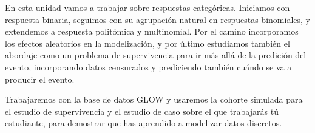 \documentclass[
  letterpaper,
  DIV=11,
  numbers=noendperiod]{scrartcl}
\begin{document}
\begin{tcolorbox}[enhanced jigsaw, breakable, colframe=quarto-callout-note-color-frame, left=2mm, arc=.35mm, colbacktitle=quarto-callout-note-color!10!white, toprule=.15mm, colback=white, coltitle=black, rightrule=.15mm, opacitybacktitle=0.6, title=\textcolor{quarto-callout-note-color}{\faInfo}\hspace{0.5em}{Mapa del caso}, titlerule=0mm, toptitle=1mm, bottomtitle=1mm, leftrule=.75mm, bottomrule=.15mm, opacityback=0]

En esta unidad vamos a trabajar sobre respuestas categóricas. Iniciamos
con respuesta binaria, seguimos con su agrupación natural en respuestas
binomiales, y extendemos a respuesta politómica y multinomial. Por el
camino incorporamos los efectos aleatorios en la modelización, y por
último estudiamos también el abordaje como un problema de supervivencia
para ir más allá de la predición del evento, incorporando datos
censurados y prediciendo también cuándo se va a producir el evento.

Trabajaremos con la base de datos GLOW y usaremos la cohorte simulada
para el estudio de supervivencia y el estudio de caso sobre el que
trabajarás tú estudiante, para demostrar que has aprendido a modelizar
datos discretos.


\end{tcolorbox}
\end{document}
